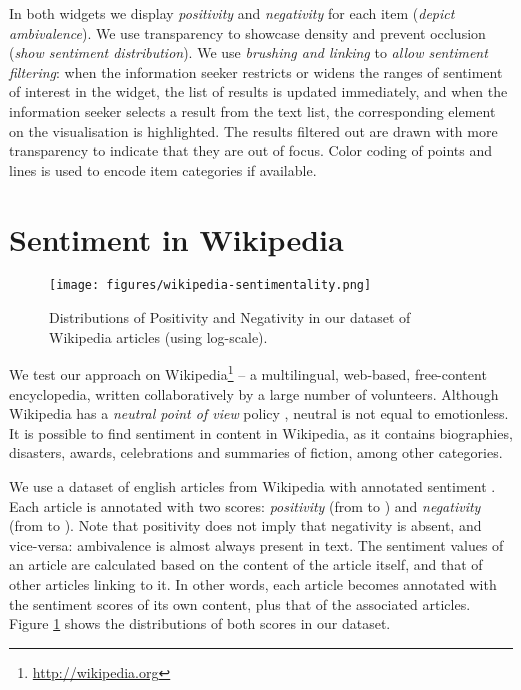 \documentclass{sig-alternate}
\newcommand{\spara}[1]{\smallskip\noindent{\bf #1}}
\begin{document}
In both widgets we display \emph{positivity} and \emph{negativity} for each item (\emph{depict ambivalence}). 
We use transparency to showcase density and prevent occlusion (\emph{show sentiment distribution}). 
We use \emph{brushing and linking} \cite{eick1995high} to \emph{allow sentiment filtering}: when the information seeker restricts or widens the ranges of sentiment of interest in the widget, the list of results is updated immediately, and when the information seeker selects a result from the text list, the corresponding element on the visualisation is highlighted. 
The results filtered out are drawn with more transparency to indicate that they are out of focus. 
Color coding of points and lines is used to encode item categories if available.







\section{Sentiment in Wikipedia}

\begin{figure}[bhtp]
\centering
\texttt{[image: figures/wikipedia-sentimentality.png]}
\caption{Distributions of Positivity and Negativity in our dataset of Wikipedia articles (using log-scale).}
\label{fig:sentiment-wikipedia}
\end{figure}

We test our approach on Wikipedia\footnote{\url{http://wikipedia.org}} -- a multilingual, web-based, free-content encyclopedia, written collaboratively by a large number of volunteers.
Although Wikipedia has a \emph{neutral point of view} policy \cite{wiki:npov}, neutral is not equal to emotionless. 
It is possible to find sentiment in content in Wikipedia, as it contains biographies, disasters, awards, celebrations and summaries of fiction, among other categories. 

\spara{Dataset.}
We use a dataset of  english articles from Wikipedia with annotated sentiment \cite{mejova2013searching}.
Each article is annotated with two scores: \emph{positivity} (from  to ) and \emph{negativity} (from  to ).  
Note that positivity does not imply that negativity is absent, and vice-versa: ambivalence is almost always present in text.
The sentiment values of an article are calculated based on the content of the article itself, and that of other articles linking to it.
In other words, each article becomes annotated with the sentiment scores of its own content, plus that of the associated articles.
Figure \ref{fig:sentiment-wikipedia} shows the distributions of both scores in our dataset.
\end{document}
